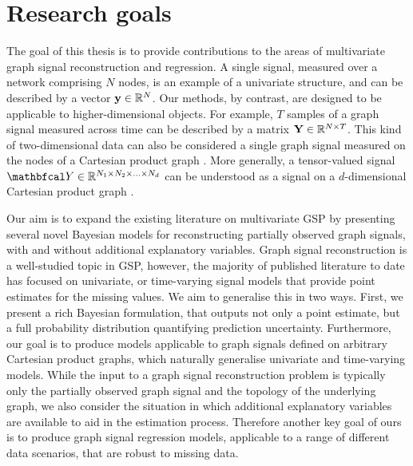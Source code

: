 \section{Research goals}


The goal of this thesis is to provide contributions to the areas of multivariate graph signal reconstruction and regression. A single signal, measured over a network comprising $N$ nodes, is an example of a univariate structure, and can be described by a vector $\mathbf{y} \in \mathbb{R}^N$. Our methods, by contrast, are designed to be applicable to higher-dimensional objects. For example, $T$ samples of a graph signal measured across time can be described by a matrix $\mathbf{Y} \in \mathbb{R}^{N \times T}$. This kind of two-dimensional data can also be considered a single graph signal measured on the nodes of a Cartesian product graph \citep{Imrich2000}. More generally, a tensor-valued signal $\Yt \in \R^{N_1 \times N_2 \times ... \times N_d}$ can be understood as a signal on a $d$-dimensional Cartesian product graph \citep{Stanley2020}. 

\newpage


Our aim is to expand the existing literature on multivariate GSP by presenting several novel Bayesian models for reconstructing partially observed graph signals, with and without additional explanatory variables. Graph signal reconstruction is a well-studied topic in GSP, however, the majority of published literature to date has focused on univariate, or time-varying signal models that provide point estimates for the missing values. We aim to generalise this in two ways. First, we present a rich Bayesian formulation, that outputs not only a point estimate, but a full probability distribution quantifying prediction uncertainty. Furthermore, our goal is to produce models applicable to graph signals defined on arbitrary Cartesian product graphs, which naturally generalise univariate and time-varying models. While the input to a graph signal reconstruction problem is typically only the partially observed graph signal and the topology of the underlying graph, we also consider the situation in which additional explanatory variables are available to aid in the estimation process. Therefore another key goal of ours is to produce graph signal regression models, applicable to a range of different data scenarios, that are robust to missing data. 


